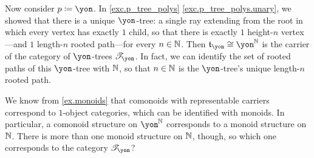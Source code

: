 \documentclass[Book-Poly]{subfiles}
\begin{document}
\begin{example} \label{ex.yon_tree_nn}
Now consider $p\coloneqq\yon$.
In \cref{exc.p_tree_polys} \cref{exc.p_tree_polys.unary}, we showed that there is a unique $\yon$-tree: a single ray extending from the root in which every vertex has exactly $1$ child, so that there is exactly $1$ height-$n$ vertex---and $1$ length-$n$ rooted path---for every $n\in\mathbb{N}$.
Then $\car{t}_\yon\iso\yon^\nn$ is the carrier of the category of $\yon$-trees $\cofree\yon$.
In fact, we can identify the set of rooted paths of this $\yon$-tree with $\mathbb{N}$, so that $n\in\mathbb{N}$ is the $\yon$-tree's unique length-$n$ rooted path.

We know from \cref{ex.monoids} that comonoids with representable carriers correspond to $1$-object categories, which can be identified with monoids.
In particular, a comonoid structure on $\yon^\nn$ corresponds to a monoid structure on $\mathbb{N}$.
There is more than one monoid structure on $\mathbb{N}$, though, so which one corresponds to the category $\cofree\yon$?


\end{example}
\end{document}
